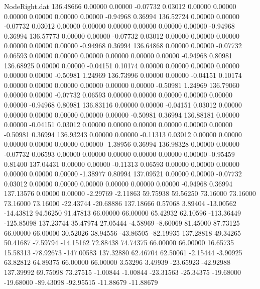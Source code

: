 \begin{filecontents}{NodeRight.dat}
 136.48666    0.00000    0.00000    -0.07732    0.03012    0.00000    0.00000    0.00000    0.00000    0.00000    0.00000   -0.94968    0.36994
 136.52724    0.00000    0.00000    -0.07732    0.03012    0.00000    0.00000    0.00000    0.00000    0.00000    0.00000   -0.94968    0.36994
 136.57773    0.00000    0.00000    -0.07732    0.03012    0.00000    0.00000    0.00000    0.00000    0.00000    0.00000   -0.94968    0.36994
 136.64868    0.00000    0.00000    -0.07732    0.06593    0.00000    0.00000    0.00000    0.00000    0.00000    0.00000   -0.94968    0.80981
 136.68925    0.00000    0.00000    -0.04151    0.10174    0.00000    0.00000    0.00000    0.00000    0.00000    0.00000   -0.50981    1.24969
 136.73996    0.00000    0.00000    -0.04151    0.10174    0.00000    0.00000    0.00000    0.00000    0.00000    0.00000   -0.50981    1.24969
 136.79060    0.00000    0.00000    -0.07732    0.06593    0.00000    0.00000    0.00000    0.00000    0.00000    0.00000   -0.94968    0.80981
 136.83116    0.00000    0.00000    -0.04151    0.03012    0.00000    0.00000    0.00000    0.00000    0.00000    0.00000   -0.50981    0.36994
 136.88181    0.00000    0.00000    -0.04151    0.03012    0.00000    0.00000    0.00000    0.00000    0.00000    0.00000   -0.50981    0.36994
 136.93243    0.00000    0.00000    -0.11313    0.03012    0.00000    0.00000    0.00000    0.00000    0.00000    0.00000   -1.38956    0.36994
 136.98328    0.00000    0.00000    -0.07732    0.06593    0.00000    0.00000    0.00000    0.00000    0.00000    0.00000   -0.95459    0.81400
 137.04431    0.00000    0.00000    -0.11313    0.06593    0.00000    0.00000    0.00000    0.00000    0.00000    0.00000   -1.38977    0.80994
 137.09521    0.00000    0.00000    -0.07732    0.03012    0.00000    0.00000    0.00000    0.00000    0.00000    0.00000   -0.94968    0.36994
 137.13576    0.00000    0.00000    -2.29769   -2.11863   59.75938   59.56250   73.16000   73.16000   73.16000   73.16000  -22.43744  -20.68886
 137.18666    0.57068    3.89404   -13.00562  -14.43812   94.56250   91.47813   66.00000   66.00000   65.42932   62.10596 -113.36449 -125.85098
 137.23744   35.47974   27.05444    -4.58969   -8.60069   81.45000   87.73125   66.00000   66.00000   30.52026   38.94556  -43.86505  -82.19935
 137.28818   49.34265   50.41687    -7.59794  -14.15162   72.88438   74.74375   66.00000   66.00000   16.65735   15.58313  -78.92673 -147.00583
 137.32880   62.46704   62.50061    -2.15444   -3.90925   63.82812   64.89375   66.00000   66.00000    3.53296    3.49939  -23.65923  -42.92988
 137.39992   69.75098   73.27515    -1.00844   -1.00844  -23.31563  -25.34375  -19.68000  -19.68000  -89.43098  -92.95515  -11.88679  -11.88679

\end{filecontents}
